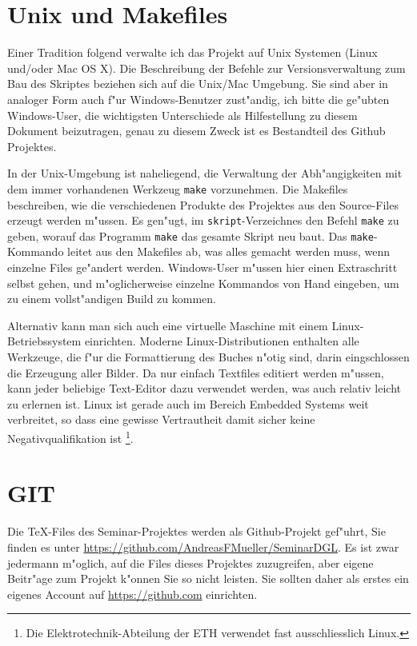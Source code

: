 \documentclass[a4paper,12pt]{article}
\begin{document}
\section{Unix und Makefiles}
Einer Tradition folgend verwalte ich das Projekt auf Unix Systemen
(Linux und/oder Mac OS X).
Die Beschreibung der Befehle zur Versionsverwaltung zum Bau des
Skriptes beziehen sich auf die Unix/Mac Umgebung.
Sie sind aber in analoger Form auch f"ur Windows-Benutzer zust"andig,
ich bitte die ge"ubten Windows-User, die wichtigsten Unterschiede
als Hilfestellung zu diesem Dokument beizutragen, genau zu diesem
Zweck ist es Bestandteil des Github Projektes.

In der Unix-Umgebung ist naheliegend, die Verwaltung der Abh"angigkeiten
mit dem immer vorhandenen Werkzeug \texttt{make} vorzunehmen.
Die Makefiles beschreiben, wie die verschiedenen Produkte des Projektes
aus den Source-Files erzeugt werden m"ussen.
Es gen"ugt, im \texttt{skript}-Verzeichnes den Befehl \texttt{make} zu geben, 
worauf das Programm \texttt{make} das gesamte Skript neu baut.
Das \texttt{make}-Kommando leitet aus den Makefiles ab, was alles gemacht
werden muss, wenn einzelne Files ge"andert werden.
Windows-User m"ussen hier einen Extraschritt selbst gehen, und m"oglicherweise
einzelne Kommandos von Hand eingeben, um zu einem vollst"andigen Build
zu kommen.

Alternativ kann man sich auch eine virtuelle Maschine mit einem
Linux-Betriebssystem einrichten.
Moderne Linux-Distributionen enthalten alle Werkzeuge, die f"ur die
Formattierung des Buches n"otig sind, darin eingschlossen die
Erzeugung aller Bilder.
Da nur einfach Textfiles editiert werden m"ussen, kann jeder beliebige
Text-Editor dazu verwendet werden, was auch relativ leicht zu erlernen ist.
Linux ist gerade auch im Bereich Embedded Systems weit verbreitet, so
dass eine gewisse Vertrautheit damit sicher keine Negativqualifikation ist%
\footnote{Die Elektrotechnik-Abteilung der ETH verwendet fast ausschliesslich
Linux.}.

\section{GIT}
Die \TeX-Files des Seminar-Projektes werden als Github-Projekt gef"uhrt,
Sie finden es unter \url{https://github.com/AndreasFMueller/SeminarDGL}.
Es ist zwar jedermann m"oglich, auf die Files dieses Projektes zuzugreifen,
aber eigene Beitr"age zum Projekt k"onnen Sie so nicht leisten.
Sie sollten daher als erstes ein eigenes Account auf \url{https://github.com}
einrichten.
\end{document}
